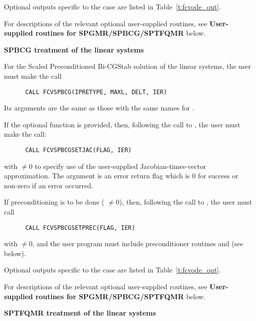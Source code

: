 \begin{Steps}
  Optional outputs specific to the {\spgmr} case are listed in
  Table~\ref{t:fcvode_out}.

  For descriptions of the relevant optional user-supplied routines, see 
  {\bf User-supplied routines for SPGMR/SPBCG/SPTFQMR} below.
  
  
  {\s}{\p} {\bf SPBCG treatment of the linear systems}
  
  For the Scaled Preconditioned Bi-CGStab solution of the linear systems,
  the user must make the call
\begin{verbatim}
      CALL FCVSPBCG(IPRETYPE, MAXL, DELT, IER)
\end{verbatim}
  Its arguments are the same as those with the same names for .

  If the optional function  is provided, then, following the call to
  , the user must make the call:
\begin{verbatim}
      CALL FCVSPBCGSETJAC(FLAG, IER)
\end{verbatim}
  with  $\neq 0$ to specify use of the user-supplied
  Jacobian-times-vector approximation.
  The argument  is an error return flag which is $0$ 
  for success or non-zero if an error occurred.
  
  If preconditioning is to be done ( $\neq 0$), then, following the
  call to , the user must call
\begin{verbatim}
      CALL FCVSPBCGSETPREC(FLAG, IER)
\end{verbatim}
  with  $\neq 0$, and the user program must include preconditioner routines
   and  (see below).

  Optional outputs specific to the {\spbcg} case are listed in
  Table~\ref{t:fcvode_out}.

  For descriptions of the relevant optional user-supplied routines, see 
  {\bf User-supplied routines for SPGMR/SPBCG/SPTFQMR} below.
  
  
  {\s}{\p} {\bf SPTFQMR treatment of the linear systems}
  

\end{Steps}
